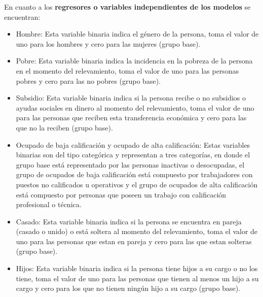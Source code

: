 \documentclass[12pt,a4paper]{article}
\begin{document}
En cuanto a los \textbf{regresores o variables independientes de los modelos} se encuentran:
\begin{itemize}
\item Hombre: Esta variable binaria indica el género de la persona, toma el valor de uno para los hombres y cero para las mujeres (grupo base).
\item Pobre: Esta variable binaria indica la incidencia en la pobreza de la persona en el momento del relevamiento, toma el valor de uno para las personas pobres y cero para las no pobres (grupo base).
\item Subsidio: Esta variable binaria indica si la persona recibe o no  subsidios o ayudas sociales en dinero al momento del relevamiento, toma el valor de uno para las personas que reciben esta transferencia económica y cero para las que no la reciben (grupo base).
\item Ocupado de baja calificación y ocupado de alta calificación: Estas variables binarias son del tipo categórica y representan a tres categorías, en donde el grupo base está representado por las personas inactivas o desocupadas, el grupo de ocupados de baja calificación está compuesto por trabajadores con puestos no calificados u operativos y el grupo de ocupados de alta calificación está compuesto por personas que poseen un trabajo con calificación profesional o técnica.
\item Casado: Esta variable binaria indica si la persona se encuentra en pareja (casado o unido) o está soltera al momento del relevamiento, toma el valor de uno para las personas que estan en pareja y cero para las que estan solteras (grupo base).
\item Hijos: Esta variable binaria indica si la persona tiene hijos a su cargo o no los tiene, toma el valor de uno para las personas que tienen al menos un hijo a su cargo y cero para los que no tienen ningún hijo a su cargo (grupo base). 

\end{itemize}
\end{document}
